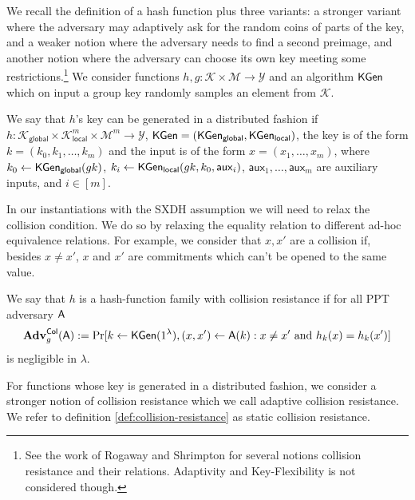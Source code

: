 
We recall the definition of a hash function plus three variants: a stronger variant where  the adversary may adaptively ask for the random coins of parts of the key, and a weaker notion where the adversary needs to find a second preimage, and another notion where the adversary can choose its own key meeting some restrictions.\footnote{See the work of Rogaway and Shrimpton \cite{FSE:RogShr04} for several notions collision resistance and their relations. Adaptivity and Key-Flexibility is not considered though.} We consider functions $h,g:\mathcal{K}\times\mathcal{M}\to\mathcal{Y}$ and an algorithm $\mathsf{KGen}$ which on input a group key randomly samples an element from $\mathcal{K}$.

We say that $h$'s key can be generated in a distributed fashion if $h:\mathcal{K}_\mathsf{global}\times\mathcal{K}^m_{\mathsf{local}}\times\mathcal{M}^m\to \mathcal{Y}$, $\mathsf{KGen} = (\mathsf{KGen}_\mathsf{global},\mathsf{KGen}_\mathsf{local})$, the key is of the form $k = (k_0,k_1,\ldots,k_m)$ and the input is of the form $x=(x_1,\ldots,x_m)$, where $k_0\gets\mathsf{KGen}_{\mathsf{global}}(gk)$, $k_i\gets\mathsf{KGen}_{\mathsf{local}}(gk,k_0,\mathsf{aux}_i)$, $\mathsf{aux}_1,\ldots,\mathsf{aux}_m$ are auxiliary inputs, and $i\in[m]$. 

In our instantiations with the SXDH assumption we will need to relax the collision condition. We do so by relaxing the equality relation to different ad-hoc equivalence relations. For example, we consider that $x,x'$ are a collision if, besides $x\neq x'$, $x$ and $x'$ are commitments which can't be opened to the same value.

\begin{definition}\label{def:hash1}
 We say that $h$ is a hash-function family with collision resistance if for all PPT adversary $\mathsf{A}$
$$
\mathbf{Adv}_g^{\mathsf{Col}}(\mathsf{A}) := \Pr[k\gets\mathsf{KGen}(1^\lambda), (x,x')\gets \mathsf{A}(k):x\neq x'\text{ and }h_k(x)=h_k(x')]
$$ 
is negligible in $\lambda$.
\label{def:collision-resistance}
\end{definition}

For functions whose key is generated in a distributed fashion, we consider a stronger notion of collision resistance which we call adaptive collision resistance. We refer to definition \ref{def:collision-resistance} as static collision resistance.


